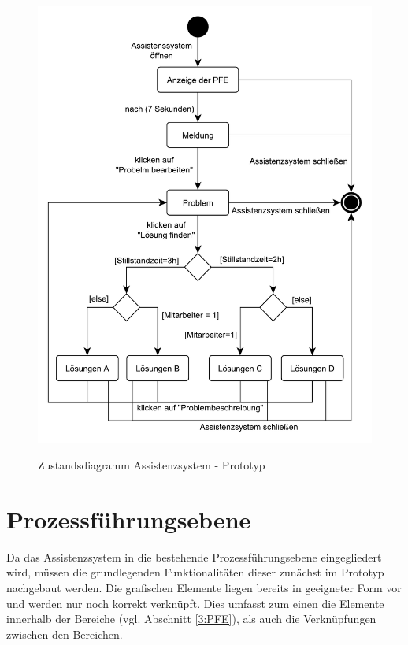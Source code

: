 \begin{figure}[tbp]
\centering
\includegraphics[scale=0.65]{DA_files/UML/Prototyp/Zustandsdiagramm-Assistenzsystem.pdf}
\label{pic:Zustandsdiagramm-Assistenzsystem}
\caption{Zustandsdiagramm Assistenzsystem - Prototyp}
\end{figure}

\section{Prozessführungsebene}
Da das Assistenzsystem in die bestehende Prozessführungsebene eingegliedert wird, müssen die grundlegenden Funktionalitäten dieser zunächst im Prototyp nachgebaut werden. Die grafischen Elemente liegen bereits in geeigneter Form vor und werden nur noch korrekt verknüpft. Dies umfasst zum einen die Elemente innerhalb der Bereiche (vgl. Abschnitt \ref{3:PFE}), als auch die Verknüpfungen zwischen den Bereichen.

